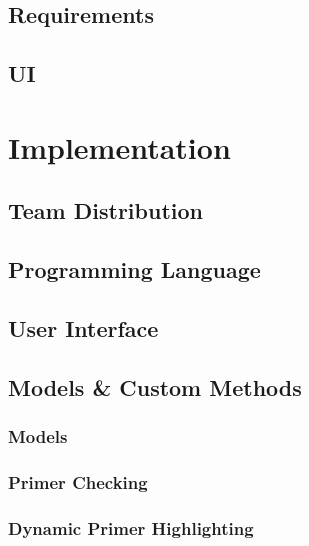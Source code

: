 \documentclass{l3proj}
\begin{document}
\section{Requirements}
\label{design:reqs}


\section{UI}
\label{design:ui}


\chapter{Implementation}
\label{chap:impl}

\section{Team Distribution}
\label{impl:teamdistribution}


\section{Programming Language}
\label{impl:proglang}


\section{User Interface}
\label{impl:ui}


\section{Models \& Custom Methods}
\label{impl:models}

\subsection{Models}


\subsection{Primer Checking}


\subsection{Dynamic Primer Highlighting}
\label{impl:models:dynHigh}

\end{document}
